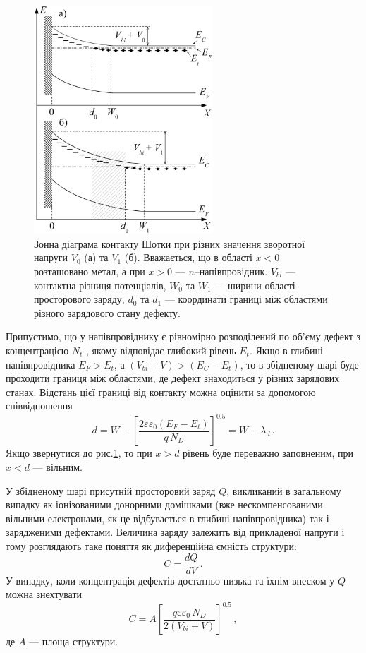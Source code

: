 \documentclass[10pt,a5paper,titlepage,oneside]{book}
\numberwithin{equation}{part}
\begin{document}
\begin{figure}[t]
\center
\vspace{-5mm}
\includegraphics[width=0.6\textwidth]{Fig2_1}
\vspace{-3mm}
\caption{Зонна діаграма контакту Шотки при
різних значення зворотної напруги $V_0$ (а) та $V_1$ (б).
Вважається, що в області $x<0$ розташовано метал,
а при  $x>0$ --- $n$--напівпровідник.
$V_{bi}$ --- контактна різниця потенціалів,
$W_0$ та $W_1$ --- ширини області просторового заряду,
$d_0$ та $d_1$ --- координати границі між областями різного зарядового
стану дефекту.
}
\vspace{-3mm}
\label{F21}
\end{figure}

Припустимо, що у напівпровіднику є рівномірно розподілений по об'єму дефект з концентрацією $N_t$ , якому
відповідає глибокий рівень $E_t$.
Якщо в глибині напівпровідника $E_F>E_t$, а $(V_{bi}+V)>(E_C-E_t)$,
то в збідненому шарі буде проходити границя між  областями, де дефект знаходиться у різних зарядових станах.
Відстань цієї границі від контакту можна оцінити за допомогою співвідношення
\begin{equation}
d=W-\left[\frac{2\varepsilon\varepsilon_0(E_F-E_t)}{q\,N_D}\right]^{0.5}=W-\lambda_d\,.
\end{equation}
Якщо звернутися до рис.\ref{F21}, то при $x>d$
рівень буде переважно заповненим, при $x<d$ --- вільним.

У збідненому шарі присутній просторовий заряд $Q$, викликаний в загальному випадку
як іонізованими донорними домішками
(вже нескомпенсованими вільними електронами, як це відбувається в глибині напівпровідника)
так і зарядженими дефектами.
Величина заряду залежить від прикладеної напруги і тому розглядають таке поняття як диференційна
ємність структури:
\begin{equation}
\label{DLTSC}
C=\frac{dQ}{dV}\,.
\end{equation}
У випадку, коли концентрація дефектів достатньо низька та їхнім внеском у $Q$ можна знехтувати
\begin{equation}
\label{DLTSCsh}
C=A\left[\frac{q\varepsilon\varepsilon_0\,N_D}{2(V_{bi}+V)}\right]^{0.5}\,,
\end{equation}
де
$A$ --- площа структури.
\end{document}

